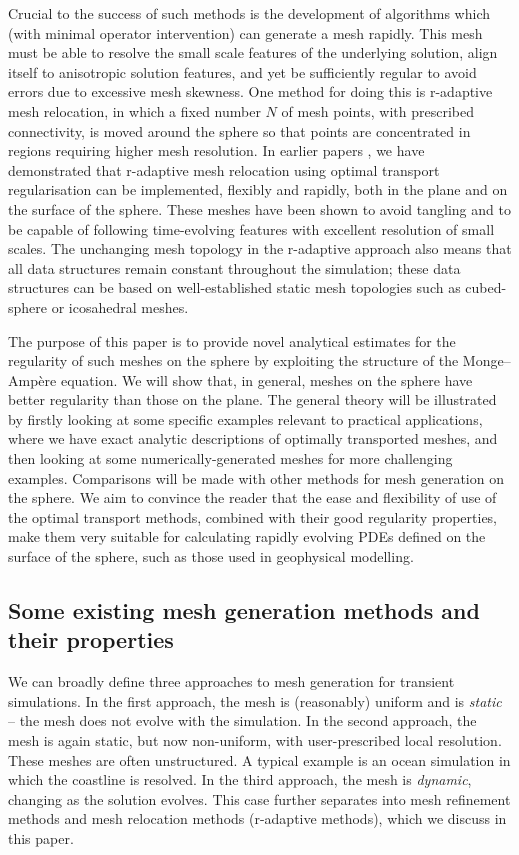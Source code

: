 \documentclass[11pt, a4paper]{scrartcl}  %
\theoremstyle{plain}
\theoremstyle{definition}
\numberwithin{equation}{section}
\begin{document}
Crucial to the success of such methods is the development of algorithms
which (with minimal operator intervention) can generate a mesh rapidly.
This mesh must be able to resolve the small scale features of the
underlying solution, align itself to anisotropic solution features, and
yet be sufficiently regular to avoid errors due to excessive mesh
skewness. One method for doing this is r-adaptive mesh relocation, in
which a fixed number $N$ of mesh points, with prescribed connectivity,
is moved around the sphere so that points are concentrated in regions
requiring higher mesh resolution. In earlier papers
\citep{weller2016mesh,mcrae2018optimal}, we have demonstrated that
r-adaptive mesh relocation using optimal transport regularisation can be
implemented, flexibly and rapidly, both in the plane and on the surface
of the sphere. These meshes have been shown to avoid tangling and to
be capable of following time-evolving features with excellent resolution
of small scales. The unchanging mesh topology in the r-adaptive approach
also means that all data structures remain constant throughout the
simulation; these data structures can be based on well-established
static mesh topologies such as cubed-sphere or icosahedral meshes.

The purpose of this paper is to provide novel analytical estimates for
the regularity of such meshes on the sphere by exploiting the structure
of the Monge--Ampère equation. We will show that, in general, meshes on
the sphere have better regularity than those on the plane. The general
theory will be illustrated by firstly looking at some specific examples
relevant to practical applications, where we have exact analytic
descriptions of optimally transported meshes, and then looking at some
numerically-generated meshes for more challenging examples.
Comparisons will be made with other methods for mesh generation on the
sphere. We aim to convince the reader that the ease and flexibility of
use of the optimal transport methods, combined with their good
regularity properties, make them very suitable for calculating rapidly
evolving PDEs defined on the surface of the sphere, such as those used
in geophysical modelling.

\subsection{Some existing mesh generation methods and their properties}

We can broadly define three approaches to mesh generation for transient
simulations. In the first approach, the mesh is (reasonably) uniform and
is \emph{static} -- the mesh does not evolve with the simulation.
In the second approach, the mesh is again static, but now non-uniform,
with user-prescribed local resolution. These meshes are often
unstructured. A typical example is an ocean simulation in which the
coastline is resolved. In the third approach, the mesh is
\emph{dynamic}, changing as the solution evolves. This case further
separates into mesh refinement methods and mesh relocation methods
(r-adaptive methods), which we discuss in this paper.
\end{document}
